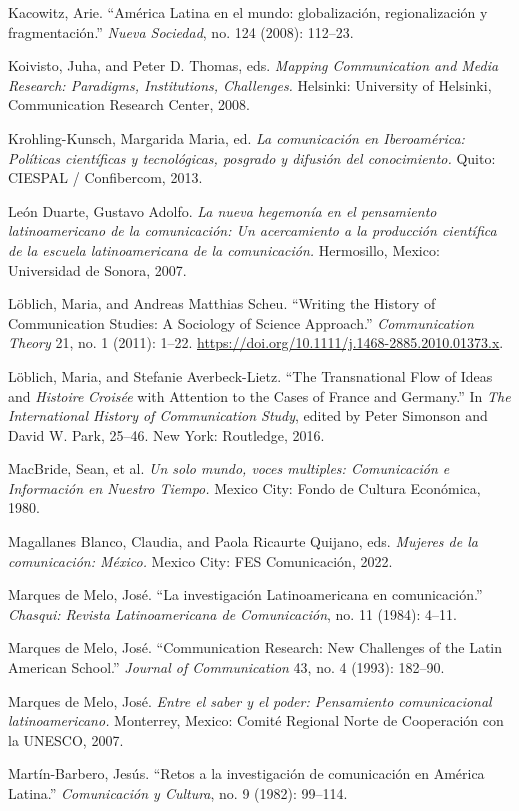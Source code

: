 \documentclass{tufte-handout}
\begin{document}
\begin{hangparas}{.25in}{1}
Kacowitz, Arie. ``América Latina en el mundo: globalización,
regionalización y fragmentación.'' \emph{Nueva Sociedad}, no. 124
(2008): 112--23.

Koivisto, Juha, and Peter D. Thomas, eds. \emph{Mapping Communication
and Media Research: Paradigms, Institutions, Challenges.} Helsinki:
University of Helsinki, Communication Research Center, 2008.

Krohling-Kunsch, Margarida Maria, ed. \emph{La comunicación en
Iberoamérica: Políticas científicas y tecnológicas, posgrado y difusión
del conocimiento.} Quito: CIESPAL / Confibercom, 2013.

León Duarte, Gustavo Adolfo. \emph{La nueva hegemonía en el pensamiento
latinoamericano de la comunicación: Un acercamiento a la producción
científica de la escuela latinoamericana de la comunicación.}
Hermosillo, Mexico: Universidad de Sonora, 2007.

Löblich, Maria, and Andreas Matthias Scheu. ``Writing the History of
Communication Studies: A Sociology of Science Approach.''
\emph{Communication Theory} 21, no. 1 (2011): 1--22.
\url{https://doi.org/10.1111/j.1468-2885.2010.01373.x}.

Löblich, Maria, and Stefanie Averbeck-Lietz. ``The Transnational Flow of
Ideas and \emph{Histoire} \emph{Croisée} with Attention to the Cases of
France and Germany.'' In \emph{The International History of
Communication Study}, edited by Peter Simonson and David W. Park,
25--46. New York: Routledge, 2016.

MacBride, Sean, et al. \emph{Un solo mundo, voces multiples:
Comunicación e Información en Nuestro Tiempo.} Mexico City: Fondo de
Cultura Económica, 1980.

Magallanes Blanco, Claudia, and Paola Ricaurte Quijano, eds.
\emph{Mujeres de la comunicación: México.} Mexico City: FES
Comunicación, 2022.

Marques de Melo, José. ``La investigación Latinoamericana en
comunicación.'' \emph{Chasqui: Revista Latinoamericana de Comunicación},
no. 11 (1984): 4--11.

Marques de Melo, José. ``Communication Research: New Challenges of the
Latin American School.'' \emph{Journal of Communication} 43, no. 4
(1993): 182--90.

Marques de Melo, José. \emph{Entre el saber y el poder: Pensamiento
comunicacional latinoamericano.} Monterrey, Mexico: Comité Regional
Norte de Cooperación con la UNESCO, 2007.

Martín-Barbero, Jesús. ``Retos a la investigación de comunicación en
América Latina.'' \emph{Comunicación y Cultura}, no. 9 (1982): 99--114.


\end{hangparas}
\end{document}

